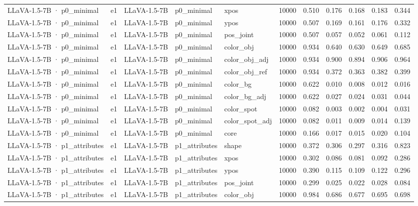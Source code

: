 \begin{tabular}{lllllrrrrrr}
LLaVA-1.5-7B · p0\_minimal & e1 & LLaVA-1.5-7B & p0\_minimal & xpos & 10000 & 0.510 & 0.176 & 0.168 & 0.183 & 0.344 \\
LLaVA-1.5-7B · p0\_minimal & e1 & LLaVA-1.5-7B & p0\_minimal & ypos & 10000 & 0.507 & 0.169 & 0.161 & 0.176 & 0.332 \\
LLaVA-1.5-7B · p0\_minimal & e1 & LLaVA-1.5-7B & p0\_minimal & pos\_joint & 10000 & 0.507 & 0.057 & 0.052 & 0.061 & 0.112 \\
LLaVA-1.5-7B · p0\_minimal & e1 & LLaVA-1.5-7B & p0\_minimal & color\_obj & 10000 & 0.934 & 0.640 & 0.630 & 0.649 & 0.685 \\
LLaVA-1.5-7B · p0\_minimal & e1 & LLaVA-1.5-7B & p0\_minimal & color\_obj\_adj & 10000 & 0.934 & 0.900 & 0.894 & 0.906 & 0.964 \\
LLaVA-1.5-7B · p0\_minimal & e1 & LLaVA-1.5-7B & p0\_minimal & color\_obj\_ref & 10000 & 0.934 & 0.372 & 0.363 & 0.382 & 0.399 \\
LLaVA-1.5-7B · p0\_minimal & e1 & LLaVA-1.5-7B & p0\_minimal & color\_bg & 10000 & 0.622 & 0.010 & 0.008 & 0.012 & 0.016 \\
LLaVA-1.5-7B · p0\_minimal & e1 & LLaVA-1.5-7B & p0\_minimal & color\_bg\_adj & 10000 & 0.622 & 0.027 & 0.024 & 0.031 & 0.044 \\
LLaVA-1.5-7B · p0\_minimal & e1 & LLaVA-1.5-7B & p0\_minimal & color\_spot & 10000 & 0.082 & 0.003 & 0.002 & 0.004 & 0.031 \\
LLaVA-1.5-7B · p0\_minimal & e1 & LLaVA-1.5-7B & p0\_minimal & color\_spot\_adj & 10000 & 0.082 & 0.011 & 0.009 & 0.014 & 0.139 \\
LLaVA-1.5-7B · p0\_minimal & e1 & LLaVA-1.5-7B & p0\_minimal & core & 10000 & 0.166 & 0.017 & 0.015 & 0.020 & 0.104 \\
LLaVA-1.5-7B · p1\_attributes & e1 & LLaVA-1.5-7B & p1\_attributes & shape & 10000 & 0.372 & 0.306 & 0.297 & 0.316 & 0.823 \\
LLaVA-1.5-7B · p1\_attributes & e1 & LLaVA-1.5-7B & p1\_attributes & xpos & 10000 & 0.302 & 0.086 & 0.081 & 0.092 & 0.286 \\
LLaVA-1.5-7B · p1\_attributes & e1 & LLaVA-1.5-7B & p1\_attributes & ypos & 10000 & 0.390 & 0.115 & 0.109 & 0.122 & 0.296 \\
LLaVA-1.5-7B · p1\_attributes & e1 & LLaVA-1.5-7B & p1\_attributes & pos\_joint & 10000 & 0.299 & 0.025 & 0.022 & 0.028 & 0.084 \\
LLaVA-1.5-7B · p1\_attributes & e1 & LLaVA-1.5-7B & p1\_attributes & color\_obj & 10000 & 0.984 & 0.686 & 0.677 & 0.695 & 0.698 \\

\end{tabular}
